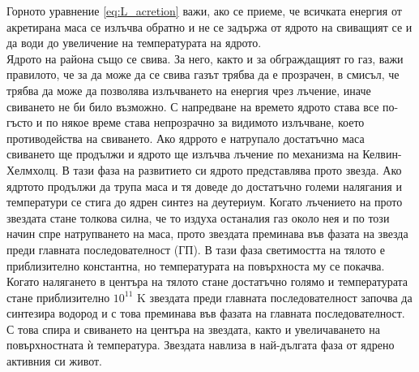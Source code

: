 \documentclass[a4paper,12pt]{article}
\begin{document}
Горното уравнение \eqref{eq:L_acretion} важи, ако се приеме, че всичката енергия от акретирана маса се излъчва обратно и не се задържа от ядрото на свиващият се и да води до увеличение на температурата на ядрото.\\ 

Ядрото на района също се свива. За него, както и за обграждащият го газ, важи правилото, че за да може да се свива газът трябва да е прозрачен, в смисъл, че трябва да може да позволява излъчването на енергия чрез лъчение, иначе свиването не би било възможно. С напредване на времето ядрото става все по-гъсто и по някое време става непрозрачно за видимото излъчване, което противодейства на свиването. Ако ядррото е натрупало достатъчно маса свиването ще продължи и ядрото ще излъчва лъчение по механизма на Келвин-Хелмхолц. В тази фаза на развитието си ядрото представлява прото звезда. Ако ядртото продължи да трупа маса и тя доведе до достатъчно големи налягания и температури се стига до ядрен синтез на деутериум. Когато лъчението на прото звездата стане толкова силна, че то издуха останалия газ около нея и по този начин спре натрупването на маса, прото звездата преминава във фазата на звезда преди главната последователност (ГП). В тази фаза светимостта на тялото е приблизително константна, но температурата на повърхноста му се покачва. Когато налягането в центъра на тялото стане достатъчно голямо и температурата стане приблизително $10^{11}$ K звездата преди главната последователност започва да синтезира водород и с това преминава във фазата на главната последователност. С това спира и свиването на центъра на звездата, както и увеличаването на повърхностната ѝ температура. Звездата навлиза в най-дългата фаза от ядрено активния си живот.\\
\end{document}
